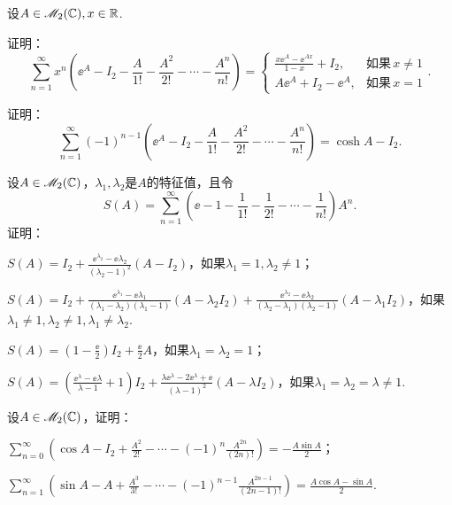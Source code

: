 \begin{mybox}
  \begin{problem}[一个指数幂级数.]

    设$A\in\mathscr M_2(\mathbb C),x\in\mathbb R$.
    \begin{enum}
      \item\label{prob4.74a} 证明：
      \[
        \sum_{n=1}^\infty x^n\left( \ee^A - I_2 - \frac A{1!} - \frac{A^2}{2!} - \cdots - \frac{A^n}{n!}\right) = \begin{cases}
          \frac{x\ee^A-\ee^{Ax}}{1-x} + I_2, & \text{如果}\, x\ne 1\\
          A\ee^A+I_2-\ee^A, & \text{如果}\, x=1
        \end{cases}.
      \]
      \item 证明：
      \[
        \sum_{n=1}^\infty (-1)^{n-1}\left( \ee^A - I_2 - \frac A{1!} - \frac{A^2}{2!} - \cdots - \frac{A^n}{n!}\right) = \cosh A - I_2.
      \]
    \end{enum}
  \end{problem}
\end{mybox}

\begin{problem}[同一主题的变体.]

  设$A\in\mathscr M_2(\mathbb C)$，$\lambda_1,\lambda_2$是$A$的特征值，且令
  \[
    S(A) = \sum_{n=1}^\infty \left( \ee -1 -\frac1{1!} - \frac1{2!} - \cdots - \frac1{n!} \right) A^n.
  \]
  证明：
  \begin{enum}
    \item $S(A)=I_2+\frac{\ee^{\lambda_2}-\ee\lambda_2}{
        (\lambda_2-1)^2}(A-I_2)$，如果$\lambda_1=1,\lambda_2\ne1$；
    \item $S(A)=I_2+\frac{\ee^{\lambda_1}-\ee\lambda_1}{
        (\lambda_1-\lambda_2)(\lambda_1-1)}
        (A-\lambda_2I_2)+\frac{\ee^{\lambda_2}-\ee\lambda_2}{
        (\lambda_2-\lambda_1)(\lambda_2-1)}
        (A-\lambda_1I_2)$，如果$\lambda_1\ne1,\lambda_2\ne1,\lambda_1\ne\lambda_2$.
    \item $S(A)=\left(1-\frac\ee2\right)I_2+\frac\ee2A$，如果$\lambda_1=\lambda_2=1$；
    \item $S(A)=\left(\frac{\ee^\lambda-\ee\lambda}{
        \lambda-1}+1\right)I_2+
        \frac{\lambda\ee^\lambda-2\ee^\lambda+\ee}{
        (\lambda-1)^2}(A-\lambda I_2)$，如果$\lambda_1=\lambda_2=\lambda\ne1$.
  \end{enum}
\end{problem}

\begin{mybox}
  \begin{problem}[正弦和余弦级数.]

    设$A\in\mathscr M_2(\mathbb C)$，证明：
    \begin{enum}
      \item $\sum_{n=0}^\infty\left( \cos A-I_2+\frac{A^2}{2!}-\cdots-(-1)^n
          \frac{A^{2n}}{(2n)!}\right)=-\frac{A\sin A}2$；
      \item $\sum_{n=1}^\infty\left( \sin A - A + \frac{A^3}{3!}-\cdots-(-1)^{n-1}
          \frac{A^{2n-1}}{(2n-1)!}\right)=
          \frac{A\cos A-\sin A}2$.
    \end{enum}
  \end{problem}
\end{mybox}

